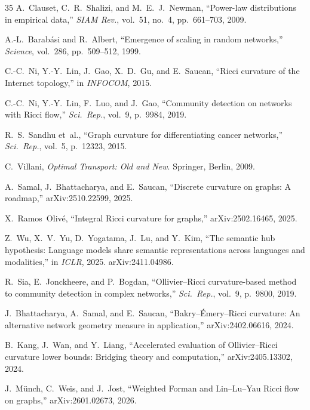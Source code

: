 \documentclass[11pt,a4paper]{article}
\begin{document}
\begin{thebibliography}{35}
A.~Clauset, C.~R.~Shalizi, and M.~E.~J.~Newman, ``Power-law distributions in empirical data,'' \emph{SIAM Rev.}, vol.~51, no.~4, pp.~661--703, 2009.

A.-L.~Barab\'asi and R.~Albert, ``Emergence of scaling in random networks,''
\emph{Science}, vol.~286, pp.~509--512, 1999.

C.-C.~Ni, Y.-Y.~Lin, J.~Gao, X.~D.~Gu, and E.~Saucan, ``Ricci curvature of the Internet topology,'' in \emph{INFOCOM}, 2015.

C.-C.~Ni, Y.-Y.~Lin, F.~Luo, and J.~Gao, ``Community detection on networks
with Ricci flow,'' \emph{Sci.~Rep.}, vol.~9, p.~9984, 2019.

R.~S.~Sandhu et~al., ``Graph curvature for differentiating cancer networks,'' \emph{Sci.~Rep.}, vol.~5, p.~12323, 2015.

C.~Villani,
\emph{Optimal Transport: Old and New}.
Springer, Berlin, 2009.

A.~Samal, J.~Bhattacharya, and E.~Saucan,
``Discrete curvature on graphs: A roadmap,''
arXiv:2510.22599, 2025.

X.~Ramos~Oliv\'e,
``Integral Ricci curvature for graphs,''
arXiv:2502.16465, 2025.

Z.~Wu, X.~V.~Yu, D.~Yogatama, J.~Lu, and Y.~Kim,
``The semantic hub hypothesis: Language models share semantic representations
across languages and modalities,''
in \emph{ICLR}, 2025. arXiv:2411.04986.

R.~Sia, E.~Jonckheere, and P.~Bogdan,
``Ollivier--Ricci curvature-based method to community detection in complex
networks,'' \emph{Sci.~Rep.}, vol.~9, p.~9800, 2019.

J.~Bhattacharya, A.~Samal, and E.~Saucan,
``Bakry--\'Emery--Ricci curvature: An alternative network geometry measure in application,''
arXiv:2402.06616, 2024.

B.~Kang, J.~Wan, and Y.~Liang,
``Accelerated evaluation of Ollivier--Ricci curvature lower bounds: Bridging theory and computation,''
arXiv:2405.13302, 2024.

J.~M\"unch, C.~Weis, and J.~Jost,
``Weighted Forman and Lin--Lu--Yau Ricci flow on graphs,''
arXiv:2601.02673, 2026.


\end{thebibliography}
\end{document}

